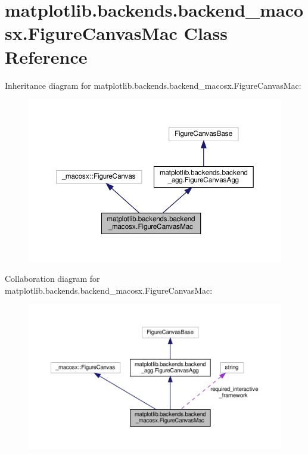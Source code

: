 \hypertarget{classmatplotlib_1_1backends_1_1backend__macosx_1_1FigureCanvasMac}{}\section{matplotlib.\+backends.\+backend\+\_\+macosx.\+Figure\+Canvas\+Mac Class Reference}
\label{classmatplotlib_1_1backends_1_1backend__macosx_1_1FigureCanvasMac}


Inheritance diagram for matplotlib.\+backends.\+backend\+\_\+macosx.\+Figure\+Canvas\+Mac\+:
\nopagebreak
\begin{figure}[H]
\begin{center}
\leavevmode
\includegraphics[width=350pt]{classmatplotlib_1_1backends_1_1backend__macosx_1_1FigureCanvasMac__inherit__graph}
\end{center}
\end{figure}


Collaboration diagram for matplotlib.\+backends.\+backend\+\_\+macosx.\+Figure\+Canvas\+Mac\+:
\nopagebreak
\begin{figure}[H]
\begin{center}
\leavevmode
\includegraphics[width=350pt]{classmatplotlib_1_1backends_1_1backend__macosx_1_1FigureCanvasMac__coll__graph}
\end{center}
\end{figure}
